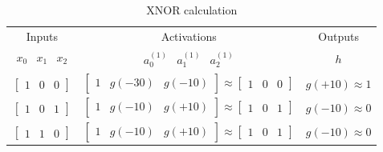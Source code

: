 \begin{itemize}
    \begin{table}[H]
        \renewcommand\arraystretch{1.5}
        \caption{XNOR calculation}
        \centering
        \begin{tabular}{ccc}
            \hline\hline %
            Inputs                                                     & Activations                                                                                                                         & Outputs            \\ 
            $\begin{array}{ccc} x_0 & x_1 & x_2 \end{array}$           & $\begin{array}{ccc} a^{(1)}_0 & a^{(1)}_1 & a^{(1)}_2 \end{array}$                                                                  & $h$                \\ 
            \hline %
            $\left[{\begin{array}{ccc} 1 & 0 & 0 \end{array}}\right]$  & $\left[{\begin{array}{ccc} 1 & g(-30) & g(-10) \end{array}}\right] \approx \left[{\begin{array}{ccc} 1 & 0 & 0 \end{array}}\right]$ & $g(+10) \approx 1$ \\ 
            $\left[{\begin{array}{ccc} 1 & 0 & 1 \end{array}}\right]$  & $\left[{\begin{array}{ccc} 1 & g(-10) & g(+10) \end{array}}\right] \approx \left[{\begin{array}{ccc} 1 & 0 & 1 \end{array}}\right]$ & $g(-10) \approx 0$ \\
            $\left[{\begin{array}{ccc} 1 & 1 & 0 \end{array}}\right]$  & $\left[{\begin{array}{ccc} 1 & g(-10) & g(+10) \end{array}}\right] \approx \left[{\begin{array}{ccc} 1 & 0 & 1 \end{array}}\right]$ & $g(-10) \approx 0$ \\

\end{tabular}
\end{table}
\end{itemize}

